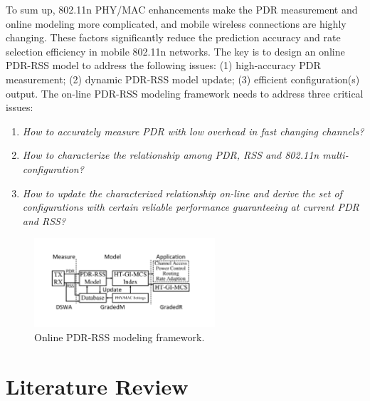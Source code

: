 \documentclass[journal,onecolumn,12pt]{IEEEtran}
\begin{document}
To sum up, 802.11n PHY/MAC enhancements make the PDR measurement and online modeling more complicated, and mobile wireless connections are highly changing. These factors significantly reduce the prediction accuracy and rate selection efficiency in mobile 802.11n networks. The key is to design an online PDR-RSS model to address the following issues: (1) high-accuracy PDR measurement; (2) dynamic PDR-RSS model update; (3) efficient configuration(s) output. The on-line PDR-RSS modeling framework needs to address three critical issues:
\begin{enumerate}
  \item \textit{How to accurately measure PDR with low overhead in fast changing channels?}
  \item \textit{How to characterize the relationship among PDR, RSS and 802.11n multi-configuration?}
  \item \textit{How to update the characterized relationship on-line and derive the set of configurations with certain reliable performance guaranteeing at current PDR and RSS?}
\end{enumerate}

\begin{figure}[!t]
\centering
\includegraphics[width=0.6\textwidth]{modeling.pdf}
\caption{Online PDR-RSS modeling framework.}
\label{onlinemodel}
\end{figure}

\section{Literature Review}
\end{document}
